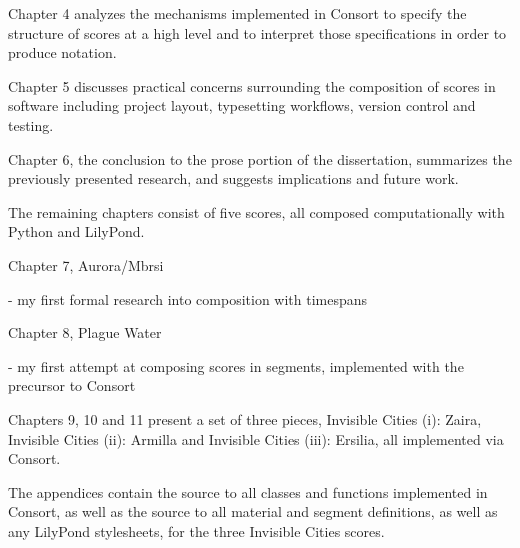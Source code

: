 \begin{markdown}
Chapter 4 analyzes the mechanisms implemented in Consort to specify the
structure of scores at a high level and to interpret those specifications in
order to produce notation.

Chapter 5 discusses practical concerns surrounding the composition of scores in
software including project layout, typesetting workflows, version control and
testing.

Chapter 6, the conclusion to the prose portion of the dissertation, summarizes
the previously presented research, and suggests implications and future work.

The remaining chapters consist of five scores, all composed computationally
with Python and LilyPond.

Chapter 7, Aurora/Mbrsi

- my first formal research into composition with timespans

Chapter 8, Plague Water

- my first attempt at composing scores in segments, implemented with the
precursor to Consort

Chapters 9, 10 and 11 present a set of three pieces, Invisible Cities (i):
Zaira, Invisible Cities (ii): Armilla and Invisible Cities (iii): Ersilia, all
implemented via Consort.

The appendices contain the source to all classes and functions implemented in
Consort, as well as the source to all material and segment definitions, as well
as any LilyPond stylesheets, for the three Invisible Cities scores.

\end{markdown}